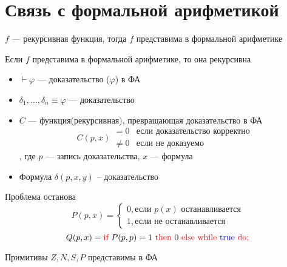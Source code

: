 \documentclass[oneside]{book}
\begin{document}
\section{Связь с формальной арифметикой}
\label{sec:org9a199b7}
\begin{theorem}
	\(f\) --- рекурсивная функция, тогда \(f\) представима в формальной арифметике
	\label{orga43f28f}
\end{theorem}
\begin{theorem}
	Если \(f\) представима в формальной арифметике, то она рекурсивна
	\label{org206706c}
\end{theorem}
\begin{remark}
	\-
	\begin{itemize}
		\item \(\vdash \varphi\) --- доказательство (\(\varphi\)) в ФА
		\item \(\delta_1, \dots, \delta_n \equiv \varphi\) --- доказательство
		\item \(C\) --- функция(рекурсивная), превращающая доказательство в ФА \\
		      \[ C(p, x) \begin{matrix}
				      = 0    & \text{если доказательство корректно} \\
				      \neq 0 & \text{если не доказуемо}
			      \end{matrix} \], где \(p\) --- запись доказательства, \(x\) --- формула
		\item Формула \(\delta(p, x, y)\) -- доказательство
	\end{itemize}
\end{remark}
\todo
\begin{remark}
	Проблема останова
	\[P(p, x) = \begin{cases}
			0, \text{если }p(x)\text{ останавливается} \\
			1, \text{если не останавливается}
		\end{cases} \]
	\[ Q(p, x) = \text{\color{red}if } P(p, p) = 1 \text{ \color{red}then } 0 \text{ \color{red}else while \color{blue}true \color{red}do;}\]
\end{remark}
\begin{theorem}
	Примитивы \(Z, N, S, P\) представимы в ФА
	\label{org2c16268}
\end{theorem}
\end{document}

